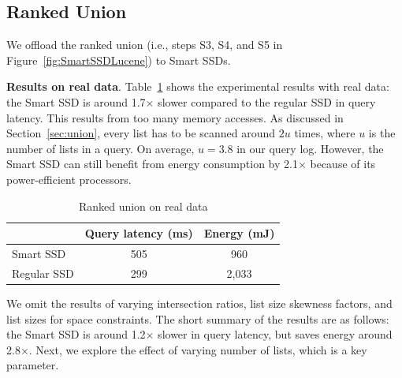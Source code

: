 \subsection{Ranked Union}\label{sec:expRankedUnion}
We offload the \textsf{ranked union} (i.e., steps S3, S4, and S5 in Figure~\ref{fig:SmartSSDLucene}) to Smart SSDs. %

\textbf{Results on real data}.
Table~\ref{tab:unionRealData} shows the experimental results with real data: the Smart SSD is  around 1.7$\times$ slower compared to the regular SSD in query latency. This results from too many memory accesses. As discussed in Section~\ref{sec:union}, every list has to be scanned around $2u$ times, where $u$ is the number of lists in a query. On average, $u=3.8$ in our query log. However, the Smart SSD can still benefit from energy consumption by 2.1$\times$ because of its power-efficient processors.


\begin{table}[tbp]\small
\centering
\begin{tabular}{l|c|c}\hline\hline
& \textbf{Query latency (ms)} & \textbf{Energy (mJ)}\\\hline
Smart SSD & 505 & 960 \\\hline
Regular SSD & 299 & 2,033  \\\hline\hline
\end{tabular}
\caption{Ranked union on real data}\label{tab:unionRealData}
\end{table}

We omit the results of varying intersection ratios, list size skewness factors, and list sizes for space constraints. The short summary of the results are as follows: the Smart SSD is  around 1.2$\times$ slower in query latency, but saves energy around 2.8$\times$. Next, we explore the effect of varying number of lists, which is a key parameter.

